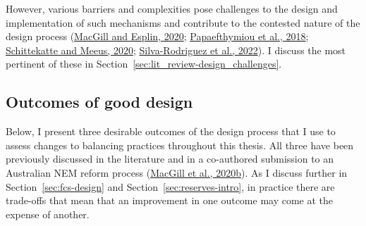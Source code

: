 \documentclass[12pt,a4paper,]{report}
\begin{document}
However, various barriers and complexities pose challenges to the design
and implementation of such mechanisms and contribute to the contested
nature of the design process
(\protect\hyperlink{ref-macgillEndtoendElectricityMarket2020}{MacGill
and Esplin, 2020};
\protect\hyperlink{ref-papaefthymiouPowerSystemFlexibility2018}{Papaefthymiou
et al., 2018};
\protect\hyperlink{ref-schittekatteFlexibilityMarketsProject2020}{Schittekatte
and Meeus, 2020};
\protect\hyperlink{ref-silva-rodriguezShortTermWholesale2022}{Silva-Rodriguez
et al., 2022}). I discuss the most pertinent of these in
Section~\ref{sec:lit_review-design_challenges}.

\hypertarget{sec:lit_review-design_outcomes}{%
\subsection{Outcomes of good
design}\label{sec:lit_review-design_outcomes}}

Below, I present three desirable outcomes of the design process that I
use to assess changes to balancing practices throughout this thesis. All
three have been previously discussed in the literature and in a
co-authored submission to an Australian NEM reform process
(\protect\hyperlink{ref-macgillResponseEnergySecurity2020}{MacGill et
al., 2020b}). As I discuss further in Section~\ref{sec:fcs-design} and
Section~\ref{sec:reserves-intro}, in practice there are trade-offs that
mean that an improvement in one outcome may come at the expense of
another.
\end{document}
